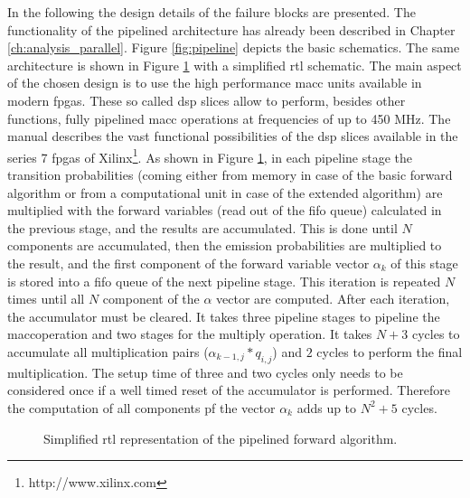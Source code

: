 \documentclass[mscthesis]{usiinfthesis}
\begin{document}
In the following the design details of the failure blocks are presented.
The functionality of the pipelined architecture has already been described in
Chapter \ref{ch:analysis_parallel}. Figure \ref{fig:pipeline} depicts the
basic schematics. The same architecture is shown in Figure \ref{fig:arch_pipe}
with a simplified \gls{rtl} schematic. The main aspect of the chosen design is
to use the high performance \gls{macc} units available in modern \glspl{fpga}.
These so called \gls{dsp} slices allow to perform, besides other functions,
fully pipelined \gls{macc} operations at frequencies of up to 450 MHz. The
manual \cite{xilinx_DSP} describes the vast functional possibilities of the
\gls{dsp} slices available in the series 7 \glspl{fpga} of
Xilinx\footnote{http://www.xilinx.com}. As shown in Figure \ref{fig:arch_pipe},
in each pipeline stage the transition probabilities (coming either from memory
in case of the basic forward algorithm or from a computational unit in case
of the extended algorithm) are multiplied with the forward variables (read out
of the \gls{fifo} queue) calculated in the previous stage, and the results are
accumulated. This is done until $N$ components are accumulated, then the
emission probabilities are multiplied to the result, and the first component of
the forward variable vector $\alpha_k$ of this stage is stored into a \gls{fifo}
queue of the next pipeline stage. This iteration is repeated $N$ times until
all $N$ component of the $\alpha$ vector are computed. After each iteration,
the accumulator must be cleared. It takes three pipeline stages to pipeline the
\gls{macc}operation and two stages for the multiply operation. It takes $N+3$
cycles to accumulate all multiplication pairs ($\alpha_{k-1, j} * q_{i,j}$) and
$2$ cycles to perform the final multiplication. The setup time of three and two
cycles only needs to be considered once if a well timed reset of the
accumulator is performed. Therefore the computation of all components pf the
vector $\alpha_k$ adds up to $N^2+5$ cycles.
\begin{figure}
    \centering
    
    \caption{Simplified \acrshort{rtl} representation of the pipelined forward
        algorithm.}
    \label{fig:arch_pipe}
\end{figure}
\end{document}

